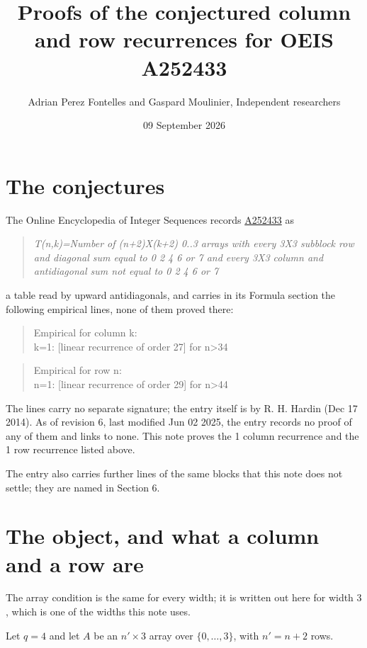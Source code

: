\documentclass[11pt]{article}
\title{Proofs of the conjectured column and row recurrences for OEIS A252433}
\author{Adrian Perez Fontelles and Gaspard Moulinier, Independent researchers}
\date{09 September 2026}
\theoremstyle{definition}
\begin{document}
\maketitle
\section{The conjectures}

The Online Encyclopedia of Integer Sequences records \href{https://oeis.org/A252433}{A252433} as

\begin{quote}\itshape T(n,k)=Number of (n+2)X(k+2) 0..3 arrays with every 3X3 subblock row and diagonal sum equal to 0 2 4 6 or 7 and every 3X3 column and antidiagonal sum not equal to 0 2 4 6 or 7\end{quote}

a table read by upward antidiagonals, and carries in its Formula section the following empirical lines, none of them proved there:

\begin{quote}\ttfamily Empirical for column k:\\
k=1: [linear recurrence of order 27] for n>34\end{quote}

\begin{quote}\ttfamily Empirical for row n:\\
n=1: [linear recurrence of order 29] for n>44\end{quote}

The lines carry no separate signature; the entry itself is by R. H. Hardin (Dec 17 2014). As of revision 6, last modified Jun 02 2025, the entry records no proof of any of them and links to none. This note proves the 1 column recurrence and the 1 row recurrence listed above.

The entry also carries further lines of the same blocks that this note does not settle; they are named in Section 6.

\section{The object, and what a column and a row are}

The array condition is the same for every width; it is written out here for width $3$, which is one of the widths this note uses.

Let $q = 4$ and let $A$ be an $n' \times 3$ array over $\{0,\dots,3\}$, with $n' = n + 2$ rows.
\end{document}
